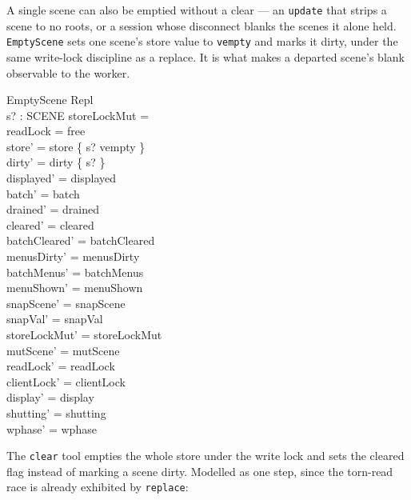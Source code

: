 \documentclass[a4paper,10pt,fleqn]{article}
\begin{document}
A single scene can also be emptied without a clear --- an \texttt{update}
that strips a scene to no roots, or a session whose disconnect blanks the
scenes it alone held.  \texttt{EmptyScene} sets one scene's store value to
\texttt{vempty} and marks it dirty, under the same write-lock discipline as
a replace.  It is what makes a departed scene's blank observable to the
worker.

\begin{schema}{EmptyScene}
  \Delta Repl \\
  s? : SCENE
\where
  storeLockMut = \emptyset \\
  readLock = free \\
  store' = store \oplus \{ s? \mapsto vempty \} \\
  dirty' = dirty \cup \{ s? \} \\
  displayed' = displayed \\
  batch' = batch \\
  drained' = drained \\
  cleared' = cleared \\
  batchCleared' = batchCleared \\
  menusDirty' = menusDirty \\
  batchMenus' = batchMenus \\
  menuShown' = menuShown \\
  snapScene' = snapScene \\
  snapVal' = snapVal \\
  storeLockMut' = storeLockMut \\
  mutScene' = mutScene \\
  readLock' = readLock \\
  clientLock' = clientLock \\
  display' = display \\
  shutting' = shutting \\
  wphase' = wphase
\end{schema}

The \texttt{clear} tool empties the whole store under the write lock and
sets the cleared flag instead of marking a scene dirty.  Modelled as one
step, since the torn-read race is already exhibited by \texttt{replace}:
\end{document}
